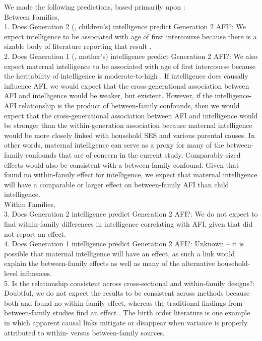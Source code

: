 We made the following predictions, based primarily upon \citet{harden2011don}:\\ 
Between Families,\\
1. Does Generation 2 (\ie, children's) intelligence predict Generation 2 AFI?: We expect intelligence to be associated with age of first intercourse because there is a sizable body of literature reporting that result \citep{kirby2002effective, manlove1998influence, raffaelli2003sexual, rodgers1994df}.\\ 
2. Does Generation 1 (\ie, mother's) intelligence predict Generation 2 AFI?: We also expect maternal intelligence to be associated with age of first intercourse because the heritability of intelligence is moderate-to-high \citep{Bouchard2004,devlin1997heritability}. If intelligence does causally influence AFI, we would expect that the cross-generational association between AFI and intelligence would be weaker, but existent. However, if the intelligence-AFI relationship is the product of between-family confounds, then we would expect that the cross-generational association between AFI and intelligence would be stronger than the within-generation association because maternal intelligence would be more closely linked with household SES and various parental causes. In other words, maternal intelligence can serve as a proxy for many of the between-family confounds that are of concern in the current study. Comparably sized effects would also be consistent with a between-family confound. Given that \citet{harden2011don} found no within-family effect for intelligence, we expect that maternal intelligence will have a comparable or larger effect on between-family AFI than child intelligence.\\
Within Families,\\
3. Does Generation 2 intelligence predict Generation 2 AFI?: We do not expect to find within-family differences in intelligence correlating with AFI, given that \citet{harden2011don} did not report an effect.\\
4. Does Generation 1 intelligence predict Generation 2 AFI?: Unknown -- it is possible that maternal intelligence will have an effect, as such a link would explain the between-family effects as well as many of the alternative household-level influences.\\
5. Is the relationship consistent across cross-sectional and within-family designs?: Doubtful, we do not expect the results to be consistent across methods because both \citet{harden2011don} and \citet{Meredith2013} found no within-family effect, whereas the traditional findings from between-family studies find an effect \citep{kirby2002effective, manlove1998influence, raffaelli2003sexual}. The birth order literature is one example in which apparent causal links mitigate or disappear when variance is properly attributed to within- versus between-family sources.